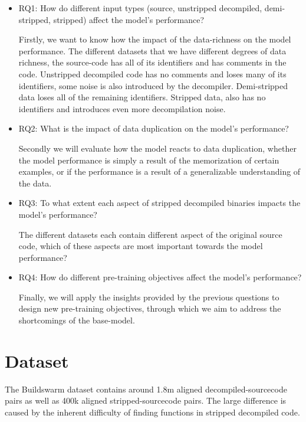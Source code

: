 \begin{itemize}
    \item RQ1: How do different input types (source, unstripped decompiled, demi-stripped, stripped) affect the model's performance?
    \begin{sloppypar}
    Firstly, we want to know how the impact of the data-richness on the model performance. The different datasets that we have different degrees of data richness, the source-code has all of its identifiers and has comments in the code. Unstripped decompiled code has no comments and loses many of its identifiers, some noise is also introduced by the decompiler. Demi-stripped data loses all of the remaining identifiers. Stripped data, also has no identifiers and introduces even more decompilation noise.
    \end{sloppypar}
    \item RQ2: What is the impact of data duplication on the model's performance?
    \begin{sloppypar}
    Secondly we will evaluate how the model reacts to data duplication, whether the model performance is simply a result of the memorization of certain examples, or if the performance is a result of a generalizable understanding of the data.
    \end{sloppypar}
    \item RQ3: To what extent each aspect of stripped decompiled binaries impacts the model's performance?
    \begin{sloppypar}
    The different datasets each contain different aspect of the original source code, which of these aspects are most important towards the model performance? 
    \end{sloppypar}
    \item RQ4: How do different pre-training objectives affect the model's performance?
    \begin{sloppypar}
    Finally, we will apply the insights provided by the previous questions to design new pre-training objectives, through which we aim to address the shortcomings of the base-model. 
    \end{sloppypar}
\end{itemize}

\section{Dataset}
The Buildswarm dataset contains around 1.8m aligned decompiled-sourcecode pairs as well as 400k aligned stripped-sourcecode pairs. The large difference is caused by the inherent difficulty of finding functions in stripped decompiled code. 

